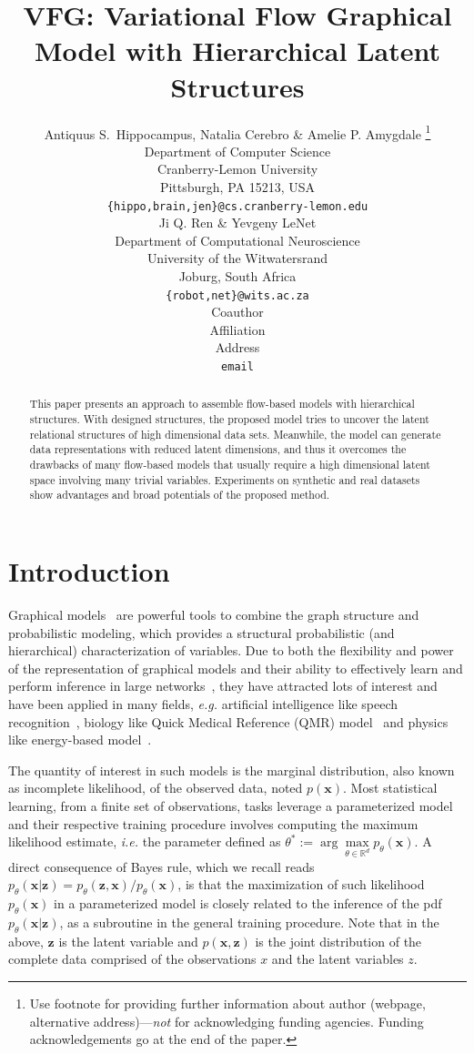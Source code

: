 \documentclass{article} %
\title{VFG: Variational Flow Graphical Model with Hierarchical Latent Structures\\
}
\author{Antiquus S.~Hippocampus, Natalia Cerebro \& Amelie P. Amygdale \thanks{ Use footnote for providing further information
about author (webpage, alternative address)---\emph{not} for acknowledging
funding agencies.  Funding acknowledgements go at the end of the paper.} \\
Department of Computer Science\\
Cranberry-Lemon University\\
Pittsburgh, PA 15213, USA \\
\texttt{\{hippo,brain,jen\}@cs.cranberry-lemon.edu} \\
\And
Ji Q. Ren \& Yevgeny LeNet \\
Department of Computational Neuroscience \\
University of the Witwatersrand \\
Joburg, South Africa \\
\texttt{\{robot,net\}@wits.ac.za} \\
\AND
Coauthor \\
Affiliation \\
Address \\
\texttt{email}
}
\begin{document}
\maketitle

\begin{abstract}
This paper presents an approach to  assemble flow-based models with hierarchical structures.  With  designed  structures, the proposed model tries to uncover the latent relational structures of  high dimensional data sets.  Meanwhile, the model can generate  data representations with reduced latent dimensions, and thus it overcomes the drawbacks of many flow-based models that usually require a high dimensional latent space involving many trivial variables.  Experiments on synthetic and real datasets show advantages and broad potentials of the proposed method. 
\end{abstract}


\section{Introduction}
Graphical models~\citep{madigan1995bayesian,hruschka2007bayesian} are powerful tools to combine the graph structure and probabilistic modeling, which provides a structural probabilistic (and hierarchical) characterization of variables. 
Due to both the flexibility and power of the representation of graphical models and their ability to effectively learn and
perform inference in large networks~\citep{koller2007graphical}, they have attracted lots of interest and have been applied in many fields, \textit{e.g.} artificial intelligence like speech recognition~\citep{bilmes2005graphical}, biology like Quick Medical Reference (QMR) model~\citep{shwe1990probabilistic} and physics like energy-based model~\citep{jordan2004graphical}.

The quantity of interest in such models is the marginal distribution, also known as incomplete likelihood, of the observed data, noted $p(\mathbf{x})$.
Most statistical learning, from a finite set of observations, tasks leverage a parameterized model and their respective training procedure involves computing the maximum likelihood estimate, \textit{i.e.} the parameter defined as $\theta^* :=  \arg \max \limits_{\theta \in \mathbb{R}^d} p_{\theta}(\mathbf{x})$.
A direct consequence of Bayes rule, which we recall reads $p_{\theta}(\mathbf{x}|\mathbf{z}) = p_{\theta}(\mathbf{z}, \mathbf{x}) / p_{\theta}(\mathbf{x})$, is that the maximization of such likelihood $p_{\theta}(\mathbf{x})$ in a parameterized model is closely related to the inference of the pdf $p_{\theta}(\mathbf{x}|\mathbf{z})$, as a subroutine in the general training procedure.
 Note that in the above, $\mathbf{z}$ is the latent variable and $p(\mathbf{x}, \mathbf{z})$ is the joint distribution of the complete data comprised of the observations $x$ and the latent variables $z$. 
\end{document}
